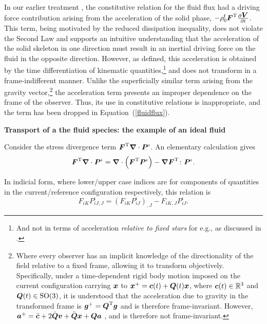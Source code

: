 In our earlier treatment \citep{growthpaper}, the constitutive
relation for the fluid flux had a driving force contribution arising
from the acceleration of the solid phase,
$-\rho_0^\mathrm{f}\mbox{\boldmath$ F$}^{\mathrm{T}}\frac{\partial \mbox{\boldmath$ V$}}{\partial t}$.
This term, being motivated by the reduced dissipation inequality, does
not violate the Second Law and supports an intuitive understanding
that the acceleration of the solid skeleton in one direction must result in
an inertial driving force on the fluid in the opposite
direction. However, as defined, this acceleration is obtained by the
time differentiation of kinematic quantities,\footnote{And not in terms
of acceleration {\em relative to fixed stars} for e.g., as discussed
in \cite[][Page 43]{TruesdellNoll:65}.} and does not transform in a
frame-indifferent manner. Unlike the superficially similar term
arising from the gravity vector,\footnote{Where every observer has an
implicit knowledge of the directionality of the field relative to a
fixed frame, allowing it to transform objectively. Specifically, under
a time-dependent rigid body motion imposed on the current
configuration carrying $\mbox{\boldmath$ x$}$ to $\mbox{\boldmath$ x$}^+ = \mbox{\boldmath$ c$}(t) + \mbox{\boldmath$ Q$}(t)\mbox{\boldmath$ x$}$, where
$\mbox{\boldmath$ c$}(t) \in \mathbb{R}^3$ and $\mbox{\boldmath$ Q$}(t) \in \mbox{SO}(3)$, it is
understood that the acceleration due to gravity in the transformed
frame is $\mbox{\boldmath$ g$}^+ = \mbox{\boldmath$ Q$}^\mathrm{T}\mbox{\boldmath$ g$}$ and is therefore
frame-invariant. However, $\mbox{\boldmath$ a$}^+ = \ddot{\mbox{\boldmath$ c$}} + 2\dot{\mbox{\boldmath$ Q$}}\mbox{\boldmath$ v$} +
\ddot{\mbox{\boldmath$ Q$}}\mbox{\boldmath$ x$} + \mbox{\boldmath$ Q$}\mbox{\boldmath$ a$}$ , and is therefore not frame-invariant.} the
acceleration 
term presents an improper dependence on the frame of the
observer. Thus, its use in constitutive relations is inappropriate,
and the term has been dropped in \mbox{Equation (\ref{fluidflux})}.

{\bf Transport of a the fluid species: the example of an ideal fluid}

Consider the stress divergence term
$\mbox{\boldmath$ F$}^\mathrm{T}\mbox{\boldmath$\nabla$}\cdot\mbox{\boldmath$ P$}^\iota$. An elementary calculation
gives
\begin{equation}
\mbox{\boldmath$ F$}^\mathrm{T}\mbox{\boldmath$\nabla$}\cdot\mbox{\boldmath$ P$}^\iota =
\mbox{\boldmath$\nabla$}\cdot\left(\mbox{\boldmath$ F$}^\mathrm{T}\mbox{\boldmath$ P$}^\iota\right) -
\mbox{\boldmath$\nabla$}\mbox{\boldmath$ F$}^\mathrm{T}\colon\mbox{\boldmath$ P$}^\iota. \label{stressdivI}
\end{equation}

\noindent In indicial form, where lower/upper case indices are for
components of quantities in the current/reference configuration
respectively, this relation is
\begin{displaymath}
F_{iK}P^\iota_{iJ,J} = \left(F_{iK}P^\iota_{iJ}\right)_{,J} -
F_{iK,J}P^\iota_{iJ}.
\end{displaymath}

